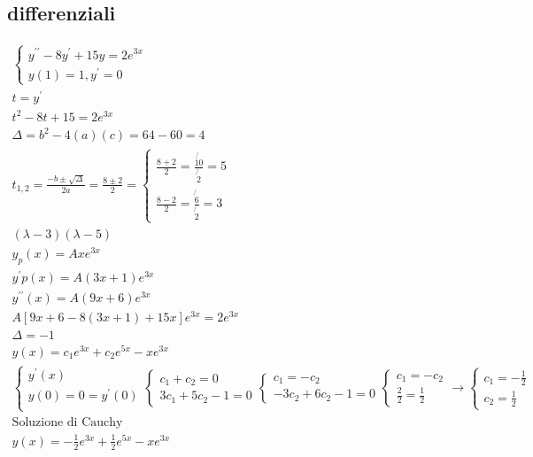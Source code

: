 \documentclass{article}
\begin{document}
\subsection{differenziali}
\begin{equation*}
	\begin{matrix}
		\begin{cases}
			y^{\prime\prime}-8y^\prime+15y=2e^{3x} \\
			y(1)=1, y^\prime=0
		\end{cases}\\
		t=y^\prime\\
		t^2-8t+15=2e^{3x}\\
		\Delta=b^2-4(a)(c)=64-60=4\\
		t_{1,2}=\frac{-b\pm\sqrt{\Delta}}{2a}=\frac{8\pm 2}{2}=\begin{cases}
			\frac{8+2}{2}=\frac{\not{10}}{\not{2}}=5\\
			\frac{8-2}{2}=\frac{\not{6}}{\not{2}}=3
		\end{cases}\\
		(\lambda-3)(\lambda-5)\\
		y_p(x)=Axe^{3x}\\
		y^\prime p(x)=A(3x+1)e^{3x}\\
		y^{\prime\prime}(x)=A(9x+6)e^{3x}\\
		A[9x+6-8(3x+1)+15x]e^{3x}=2e^{3x}\\
		\Delta=-1\\
		y(x)=c_1e^{3x}+c_2e^{5x}-xe^{3x}\\
		\begin{cases}
			y^\prime(x)\\
			y(0)=0=y^\prime(0)\\
		\end{cases}\begin{cases}
			c_1+c_2=0\\
			3c_1+5c_2-1=0
		\end{cases}\begin{cases}
			c_1=-c_2\\
			-3c_2+6c_2-1=0
		\end{cases}\begin{cases}
			c_1=-c_2\\
			\frac{2}{2}=\frac{1}{2}
		\end{cases}\to \begin{cases}
			c_1=-\frac{1}{2}\\
			c_2=\frac{1}{2}
		\end{cases}\\
		\text{Soluzione di Cauchy}\\
		y(x)=-\frac{1}{2}e^{3x}+\frac{1}{2}e^{5x}-xe^{3x}
	\end{matrix}
\end{equation*}
\end{document}
